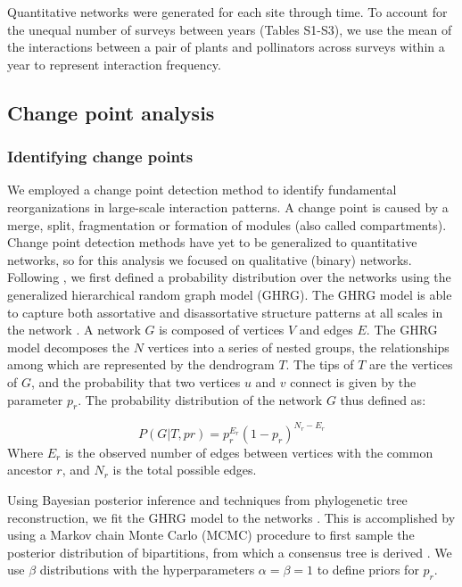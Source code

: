 \documentclass[12pt]{article}
\begin{document}
Quantitative networks were generated for each site through time. To
account for the unequal number of surveys between years (Tables
S1-S3), we use the mean of the interactions between a pair of plants
and pollinators across surveys within a year to represent interaction
frequency.

\subsection*{Change point analysis}
\subsubsection*{Identifying change points}
We employed a change point detection method \citep{peel2014detecting}
to identify fundamental reorganizations in large-scale interaction
patterns. A change point is caused by a merge, split, fragmentation or
formation of modules (also called compartments). Change point
detection methods have yet to be generalized to quantitative networks,
so for this analysis we focused on qualitative (binary)
networks. Following \cite{peel2014detecting}, we first defined a
probability distribution over the networks using the generalized
hierarchical random graph model (GHRG). The GHRG model is able to
capture both assortative and disassortative structure patterns at all
scales in the network \citep{peel2014detecting}. A network $G$ is
composed of vertices $V$ and edges $E$. The GHRG model decomposes the
$N$ vertices into a series of nested groups, the relationships among
which are represented by the dendrogram $T$. The tips of $T$ are the
vertices of $G$, and the probability that two vertices $u$ and $v$
connect is given by the parameter $p_r$. The probability distribution
of the network $G$ thus defined as:

\begin{equation}
  \label{eq:lik}
  P(G|T,{pr}) = p_r^{E_r}(1-p_r)^{N_r-E_r}
\end{equation}
% 
Where $E_r$ is the observed number of edges between vertices with the
common ancestor $r$, and $N_r$ is the total possible edges.

Using Bayesian posterior inference and techniques from phylogenetic
tree reconstruction, we fit the GHRG model to the networks
\citep{peel2014detecting}. This is accomplished by using a Markov
chain Monte Carlo (MCMC) procedure to first sample the posterior
distribution of bipartitions, from which a consensus tree is derived
\citep{peel2014detecting}. We use $\beta$ distributions with the
hyperparameters $\alpha=\beta=1$ to define priors for $p_r$.
\end{document}
